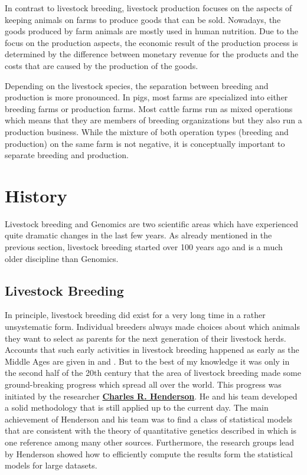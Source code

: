 \documentclass[
]{book}
\theoremstyle{definition}
\theoremstyle{definition}
\theoremstyle{definition}
\theoremstyle{remark}
\begin{document}
In contrast to livestock breeding, livestock production focuses on the aspects of keeping animals on farms to produce goods that can be sold. Nowadays, the goods produced by farm animals are mostly used in human nutrition. Due to the focus on the production aspects, the economic result of the production process is determined by the difference between monetary revenue for the products and the costs that are caused by the production of the goods.

Depending on the livestock species, the separation between breeding and production is more pronounced. In pigs, most farms are specialized into either breeding farms or production farms. Most cattle farms run as mixed operations which means that they are members of breeding organizations but they also run a production business. While the mixture of both operation types (breeding and production) on the same farm is not negative, it is conceptually important to separate breeding and production.

\hypertarget{history}{%
\section{History}\label{history}}

Livestock breeding and Genomics are two scientific areas which have experienced quite dramatic changes in the last few years. As already mentioned in the previous section, livestock breeding started over 100 years ago and is a much older discipline than Genomics.

\hypertarget{livestock-breeding}{%
\subsection{Livestock Breeding}\label{livestock-breeding}}

In principle, livestock breeding did exist for a very long time in a rather unsystematic form. Individual breeders always made choices about which animals they want to select as parents for the next generation of their livestock herds. Accounts that such early activities in livestock breeding happened as early as the Middle Ages are given in \citep{Duerst1931} and \citep{Arndorfer2010}. But to the best of my knowledge it was only in the second half of the 20th century that the area of livestock breeding made some ground-breaking progress which spread all over the world. This progress was initiated by the researcher \href{https://en.wikipedia.org/wiki/Charles_Roy_Henderson}{\textbf{Charles R. Henderson}}. He and his team developed a solid methodology that is still applied up to the current day. The main achievement of Henderson and his team was to find a class of statistical models that are consistent with the theory of quantitative genetics described in \citep{Falconer1996} which is one reference among many other sources. Furthermore, the research groups lead by Henderson showed how to efficiently compute the results form the statistical models for large datasets.
\end{document}
